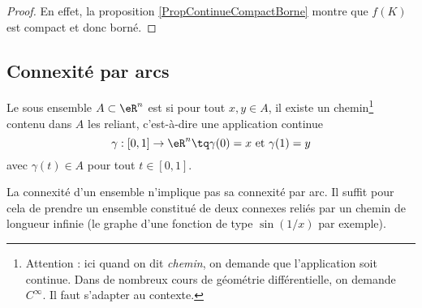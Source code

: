 \begin{proof}
	En effet, la proposition \ref{PropContinueCompactBorne} montre que $f(K)$ est compact et donc borné.
\end{proof}



\subsection{Connexité par arcs}

\begin{definition}
  Le sous ensemble $A \subset \eR^n$ est  si pour tout $x, y \in A$, il existe un chemin\footnote{Attention : ici quand on dit \emph{chemin}, on demande que l'application soit continue. Dans de nombreux cours de géométrie différentielle, on demande $ C^{\infty}$. Il faut s'adapter au contexte.} contenu dans $A$ les reliant, c'est-à-dire une application continue
  \begin{equation*}
    \gamma : [0,1] \to \eR^n \tq \gamma(0) = x~\text{et}~\gamma(1) = y
  \end{equation*}
  avec $\gamma(t) \in A$ pour tout $t\in [0,1]$.
\end{definition}

La connexité d'un ensemble n'implique pas sa connexité par arc. Il suffit pour cela de prendre un ensemble constitué de deux connexes reliés par un chemin de longueur infinie (le graphe d'une fonction de type \( \sin(1/x)\) par exemple).



